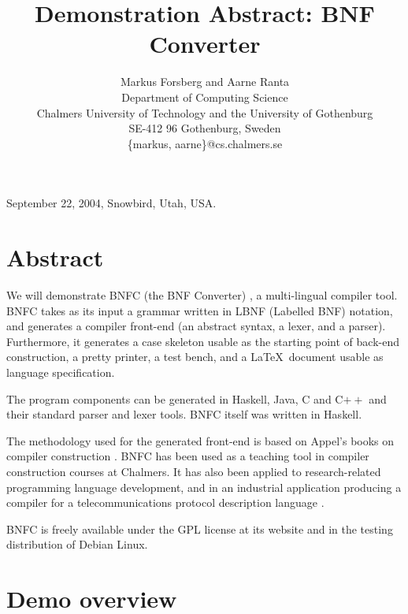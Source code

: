 \documentclass{sig-alt}
\title{Demonstration Abstract: BNF Converter}
\author{Markus Forsberg and Aarne Ranta \\
  Department of Computing Science \\
  Chalmers University of Technology and the University of Gothenburg \\
  SE-412 96 Gothenburg, Sweden\\
  \{markus, aarne\}@cs.chalmers.se
  }
\begin{document}
 {September 22, 2004, Snowbird, Utah, USA.}



\maketitle






\section*{Abstract}
We will demonstrate BNFC (the BNF Converter) \cite{bnfc,bnfcsite}, a
multi-lingual compiler tool.
BNFC takes as its input a grammar written in
LBNF (Labelled BNF) notation, and
generates a compiler front-end  
(an abstract syntax, a lexer, and a parser).
Furthermore, it
generates a case skeleton usable as the starting point of back-end
construction, a pretty printer, a test
bench, and a \LaTeX\ document usable as language specification.

The program components can be generated in Haskell, Java, C and C$++$
and their standard parser and lexer tools.
BNFC itself was written in Haskell.
 
The methodology used for the generated front-end is based on 
Appel's books on compiler construction \cite{appel,AppelC,AppelJ}.
BNFC has been used as a teaching tool in
compiler construction courses at Chalmers. 
It has also been applied to research-related programming language
development, and in an industrial application producing a compiler for a
telecommunications protocol description language \cite{asn1}. 

BNFC is freely available under the GPL license
at its website and  in the testing distribution of Debian Linux.


\section{Demo overview}
\end{document}

